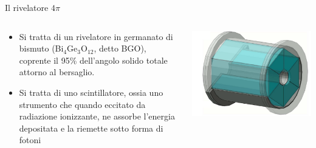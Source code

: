 \documentclass [xcolor=svgnames, 9pt] {beamer}
\begin{document}
	\begin{frame}[noframenumbering]{Il rivelatore $4\pi$}
	\begin{columns}
		\begin{column}{0.45\textwidth}
			\begin{itemize}
				\item Si tratta di un rivelatore in germanato di bismuto (Bi$_{4}$Ge$_{3}$O$_{12}$, detto BGO), coprente il 95\% dell'angolo solido totale attorno al bersaglio.
				\item Si tratta di uno scintillatore, ossia uno strumento che quando eccitato da radiazione ionizzante, ne assorbe l'energia depositata e la riemette sotto forma di fotoni
			\end{itemize}
		\end{column}
		\begin{column}{0.45\textwidth}
			\centering
			\includegraphics[width=\textwidth]{img/bgo_3d.png}
		\end{column}
	\end{columns}
	
\end{frame}
\end{document}
